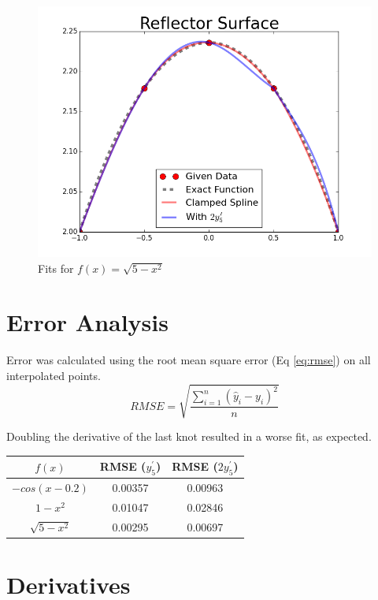 \documentclass[12pt]{article}
\begin{document}
  \begin{figure}[h!]
    \centering
    \includegraphics[scale=0.75]{arc.png}
    \caption{Fits for $f(x)=\sqrt{5-x^2}$}
  \end{figure}

  \clearpage

  \section{Error Analysis}
  Error was calculated using the root mean square error (Eq \ref{eq:rmse}) on
  all interpolated points.
  \begin{equation}
    \label{eq:rmse}
    RMSE = \sqrt{\frac{\sum_{i=1}^n(\hat{y}_i-y_i)^2}{n}}
  \end{equation}

  Doubling the derivative of the last knot resulted in a worse fit, as expected.
 
  \begin{table}[h!]
  \centering
  \begin{tabular}{| c | c | c |}
    \hline
    $f(x)$         & RMSE ($y_5^\prime$) & RMSE ($2y_5^\prime$)\\ \hline
    $-cos(x-0.2)$  & 0.00357 & 0.00963    \\
    $1-x^2$        & 0.01047 & 0.02846    \\
    $\sqrt{5-x^2}$ & 0.00295 & 0.00697    \\ \hline
  \end{tabular}
  \end{table}


  \section{Derivatives}
\end{document}
